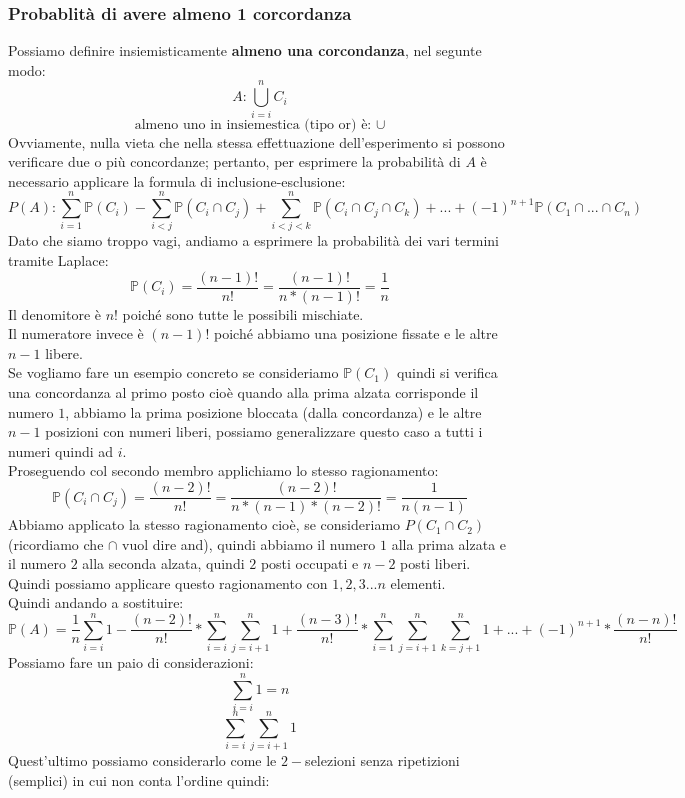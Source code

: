 \subsubsection{Probablità di avere almeno 1 corcordanza}
Possiamo definire insiemisticamente \textbf{almeno una corcondanza}, nel segunte modo: 
$$ A: \bigcup_{i=i}^n C_i$$
$$ \text{almeno uno in insiemestica (tipo or) è: } \cup $$
Ovviamente, nulla vieta che nella stessa effettuazione dell’esperimento si possono verificare due o più concordanze; pertanto, per esprimere la probabilità di $A$ è necessario applicare la formula di inclusione-esclusione:
$$ P(A): \sum_{i=1}^n \mathbb{P}(C_i) - \sum_{i<j}^n \mathbb{P}(C_i \cap C_j) + \sum_{i<j<k}^n \mathbb{P}(C_i \cap C_j \cap C_k) + ... + (-1)^{n+1} \mathbb{P} (C_1 \cap ... \cap C_n) $$
Dato che siamo troppo vagi, andiamo a esprimere la probabilità dei vari termini tramite Laplace:
$$ \mathbb{P}(C_i) = \frac{(n-1)!}{n!} = \frac{(n-1)!}{n*(n-1)!} = \frac{1}{n} $$
Il denomitore è $n!$ poiché sono tutte le possibili mischiate.\\
Il numeratore invece è $(n-1)!$ poiché abbiamo una posizione fissate e le altre $n-1$ libere.\\
Se vogliamo fare un esempio concreto se consideriamo $\mathbb{P}(C_1)$ quindi si verifica una concordanza al primo posto cioè quando alla prima alzata corrisponde il numero $1$, abbiamo la prima posizione bloccata (dalla concordanza) e le altre $n-1$ posizioni con numeri liberi, possiamo generalizzare questo caso a tutti i numeri quindi ad $i$.\\
Proseguendo col secondo membro applichiamo lo stesso ragionamento:
$$ \mathbb{P}(C_i \cap C_j) = \frac{(n-2)!}{n!} = \frac{(n-2)!}{n*(n-1)*(n-2)!} = \frac{1}{n(n-1)}  $$
Abbiamo applicato la stesso ragionamento cioè, se consideriamo $ P(C_1 \cap C_2)$ (ricordiamo che $\cap$ vuol dire and), quindi abbiamo il numero $1$ alla prima alzata e il numero $2$ alla seconda alzata, quindi $2$ posti occupati e $n-2$ posti liberi.\\
Quindi possiamo applicare questo ragionamento con $1,2,3...n$ elementi.\\
Quindi andando a sostituire:
$$ \mathbb{P}(A) = \frac{1}{n} \sum_{i=i}^n 1 - \frac{(n-2)!}{n!} * \sum_{i=i}^n \sum_{j=i+1}^n 1 + \frac{(n-3)!}{n!} * \sum_{i=1}^n \sum_{j=i+1}^n \sum_{k=j+1}^n 1 + ... + (-1)^{n+1} * \frac{(n-n)!}{n!} $$
Possiamo fare un paio di considerazioni:
$$ \sum_{i=i}^n 1 = n $$
$$ \sum_{i=i}^n \sum_{j=i+1}^n 1 $$
Quest'ultimo possiamo considerarlo come le $2-$selezioni senza ripetizioni (semplici) in cui non conta l'ordine quindi:
